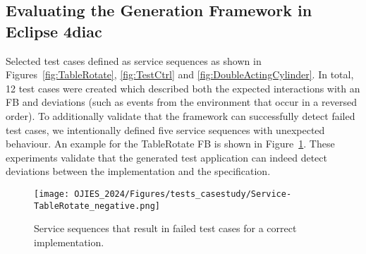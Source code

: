 \subsection{Evaluating the Generation Framework in Eclipse 4diac}
Selected test cases defined as service sequences as shown in Figures~\ref{fig:TableRotate}, \ref{fig:TestCtrl} and \ref{fig:DoubleActingCylinder}. In total, 12 test cases were created which described both the expected interactions with an FB and deviations (such as events from the environment that occur in a reversed order). To additionally validate that the framework can successfully detect failed test cases, we intentionally defined five service sequences with unexpected behaviour. An example for the TableRotate FB is shown in Figure~\ref{fig:table_rotate_fail}. These experiments validate that the generated test application can indeed detect deviations between the implementation and the specification.

\begin{figure}[hbt]
    \centering
    \texttt{[image: OJIES\_2024/Figures/tests\_casestudy/Service-TableRotate\_negative.png]}
    \caption{Service sequences that result in failed test cases for a correct implementation.}
    \label{fig:table_rotate_fail}
\end{figure}



\begin{comment}
\subsubsection{Test case definitions}
Double-acting cylinder
- when it is at home: EXTEND  -> instead of accidentally retract

TestCtrl
- forget to check the sensor value in the ECC

TableRotate
- rotating on/off
- if rotating does not stop after some time, we have a problem (signal inPosition not received -> then it does not stop rotating)
- real example: if you forget to turn a little, the sensor value does not get update


- specify test cases
- introduce faults!?
- try to detect faults with the specified test cases
- report results
\end{comment}

